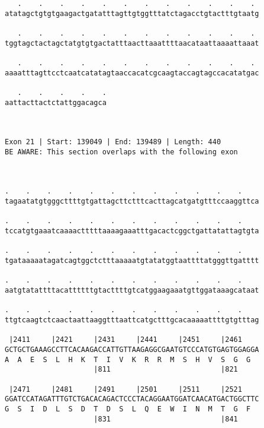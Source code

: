 \documentclass{article}
\begin{document}
\begin{Verbatim}
   .    .    .    .    .    .    .    .    .    .    .    . 
atatagctgtgtgaagactgatatttagttgtggtttatctagacctgtactttgtaatg
                                                            
   .    .    .    .    .    .    .    .    .    .    .    . 
tggtagctactagctatgtgtgactatttaacttaaattttaacataattaaaattaaat
                                                            
   .    .    .    .    .    .    .    .    .    .    .    . 
aaaatttagttcctcaatcatatagtaaccacatcgcaagtaccagtagccacatatgac
                                                            
   .    .    .    .    .
aattacttactctattggacagca
                        
                        
 
Exon 21 | Start: 139049 | End: 139489 | Length: 440
BE AWARE: This section overlaps with the following exon



.    .    .    .    .    .    .    .    .    .    .    .    
tagaatatgtgggcttttgtgattagcttctttcacttagcatgatgtttccaaggttca
                                                            
.    .    .    .    .    .    .    .    .    .    .    .    
tccatgtgaaatcaaaactttttaaaagaaatttgacactcggctgattatattagtgta
                                                            
.    .    .    .    .    .    .    .    .    .    .    .    
tgataaaaatagatcagtggctctttaaaaatgtatatggtaattttatgggttgatttt
                                                            
.    .    .    .    .    .    .    .    .    .    .    .    
aatgtatattttacattttttgtacttttgtcatggaagaaatgttggataaagcataat
                                                            
.    .    .    .    .    .    .    .    .    .    .    .    
ttgtcaagtctcaactaattaaggtttaattcatgctttgcacaaaaattttgtgtttag
                                                            
 |2411     |2421     |2431     |2441     |2451     |2461    
GCTGCTGAAAGCCTTCACAAGACCATTGTTAAGAGGCGAATGTCCCATGTGAGTGGAGGA
A  A  E  S  L  H  K  T  I  V  K  R  R  M  S  H  V  S  G  G  
                     |811                          |821     
  
 |2471     |2481     |2491     |2501     |2511     |2521    
GGATCCATAGATTTGTCTGACACAGACTCCCTACAGGAATGGATCAACATGACTGGCTTC
G  S  I  D  L  S  D  T  D  S  L  Q  E  W  I  N  M  T  G  F  
                     |831                          |841     
  

\end{Verbatim}
\end{document}
